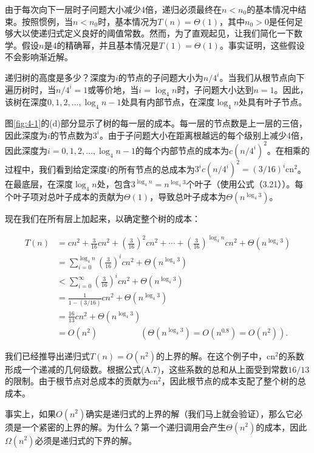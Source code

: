 \documentclass[lang=cn,newtx,10pt,scheme=chinese]{elegantbook}
\begin{document}
由于每次向下一层时子问题大小减少4倍，递归必须最终在$n<n_0$的基本情况中结束。按照惯例，当$n<n_0$时，基本情况为$T(n)=\Theta(1)$，其中$n_0>0$是任何足够大以使递归式定义良好的阈值常数。然而，为了直观起见，让我们简化一下数学。假设$n$是4的精确幂，并且基本情况是$T(1)=\Theta(1)$。事实证明，这些假设不会影响渐近解。

递归树的高度是多少？深度为$i$的节点的子问题大小为$n / 4^i$。当我们从根节点向下遍历树时，当$n / 4^i=1$或等价地，当$i=\log _4 n$时，子问题大小达到$n=1$。因此，该树在深度$0,1,2,\ldots,\log _4 n-1$处具有内部节点，在深度$\log _4 n$处具有叶子节点。

图\ref{fig:4-1}的(d)部分显示了树的每一层的成本。每一层的节点数是上一层的三倍，因此深度为$i$的节点数为$3^i$。由于子问题大小在距离根越远的每个级别上减少4倍，因此深度为$i=0,1,2,\ldots,\log _4 n-1$的每个内部节点的成本为$c\left(n / 4^i\right)^2$。在相乘的过程中，我们看到给定深度$i$的所有节点的总成本为$3^ic\left(n / 4^i\right)^2=(3 / 16)^i \mathrm{cn}^2$。在最底层，在深度$\log _4 n$处，包含$3^{\log _4 n}=n^{\log _4 3}$个叶子（使用公式（3.21））。每个叶子项对总叶子成本的贡献为$\Theta(1)$，导致总叶子成本为$\Theta\left(n^{\log _4 3}\right)$。

现在我们在所有层上加起来，以确定整个树的成本：

$$
\begin{aligned}
T(n) & =c n^2+\frac{3}{16} c n^2+\left(\frac{3}{16}\right)^2 c n^2+\cdots+\left(\frac{3}{16}\right)^{\log _4 n} c n^2+\Theta(n^{\log _4 3}) \\
& =\sum_{i=0}^{\log _4 n}\left(\frac{3}{16}\right)^i c n^2+\Theta(n^{\log _4 3}) \\
& <\sum_{i=0}^{\infty}\left(\frac{3}{16}\right)^i c n^2+\Theta(n^{\log _4 3}) \\
& =\frac{1}{1-(3 / 16)} c n^2+\Theta(n^{\log _4 3}) \\
& =\frac{16}{13} c n^2+\Theta(n^{\log _4 3}) \\
& =O(n^2) \quad\quad\quad\quad\quad(\Theta(n^{\log _4 3})=O(n^{0.8})=O(n^2)) .
\end{aligned}
$$

我们已经推导出递归式$T(n)=O\left(n^2\right)$的上界的解。在这个例子中，$\mathrm{cn}^2$的系数形成一个递减的几何级数。根据公式(A.7)，这些系数的总和从上面受到常数$16/13$的限制。由于根节点对总成本的贡献为$\mathrm{cn}^2$，因此根节点的成本支配了整个树的总成本。

事实上，如果$O\left(n^2\right)$确实是递归式的上界的解（我们马上就会验证），那么它必须是一个紧密的上界的解。为什么？第一个递归调用会产生$\Theta\left(n^2\right)$的成本，因此$\Omega\left(n^2\right)$必须是递归式的下界的解。
\end{document}
